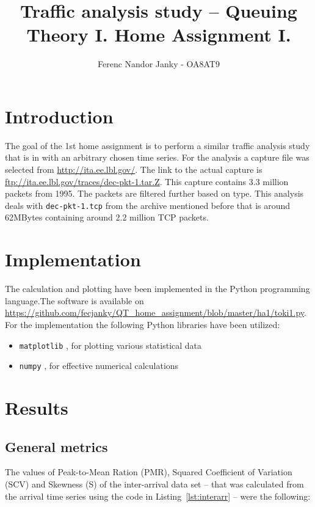 \documentclass[a4paper]{article}
\title{Traffic analysis study – Queuing Theory I. Home Assignment I.}
\author{Ferenc Nandor Janky - OA8AT9}
\date{}
\begin{document}
\maketitle

\tableofcontents

\section{Introduction}

The goal of the 1st home assignment is to perform a similar traffic analysis study that is in \cite{MolnarOnburst} with an arbitrary chosen time series.
For the analysis a capture file was selected from \url{http://ita.ee.lbl.gov/}. The link to the actual capture is \url{ftp://ita.ee.lbl.gov/traces/dec-pkt-1.tar.Z}. This capture contains 3.3 million packets from 1995. The packets are filtered further based on type. This analysis deals with \verb!dec-pkt-1.tcp! from the archive mentioned before that is around 62MBytes containing around 2.2 million TCP packets.


\section{Implementation}

The calculation and plotting have been implemented in the Python programming language.The software is available on \url{https://github.com/fecjanky/QT_home_assignment/blob/master/ha1/toki1.py}.
For the implementation the following Python libraries have been utilized:

\begin{itemize}
\item \verb!matplotlib! , for plotting various statistical data
\item \verb!numpy! , for effective numerical calculations
\end{itemize}

\section{Results}

\subsection{General metrics}

The values of Peak-to-Mean Ration (PMR), Squared Coefficient of Variation (SCV) and Skewness (S) of the inter-arrival data set  -- that was calculated from the arrival time series using the code in Listing~\ref{lst:interarr} --
 were the following:
\end{document}
